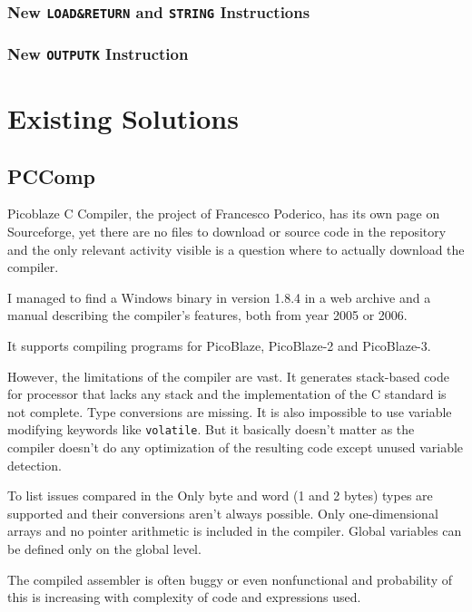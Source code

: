         \subsection{New \texttt{LOAD\&RETURN} and \texttt{STRING} Instructions}

        

        \subsection{New \texttt{OUTPUTK} Instruction}



\chapter{Existing Solutions}\label{existing}

    \section{PCComp}\label{pccomp}

    Picoblaze C Compiler, the project of Francesco Poderico, has its own page on Sourceforge, %
    yet there are no files to download or source code in the repository and the only relevant activity visible is a question where to actually download the compiler.

    I managed to find a Windows binary in version 1.8.4 in a web archive and a manual describing the compiler's features, both from year 2005 or 2006.

    It supports compiling programs for PicoBlaze, PicoBlaze-2 and PicoBlaze-3.

    However, the limitations of the compiler are vast. It generates stack-based code for processor that lacks any stack and the implementation of the C standard is not complete. Type conversions are missing. It is also impossible to use variable modifying keywords like \texttt{volatile}. But it basically doesn't matter as the compiler doesn't do any optimization %
    of the resulting code except unused variable detection.

    To list issues compared in the %
    Only byte and word (1 and 2 bytes) types are supported and their conversions aren't always possible. Only one-dimensional arrays and no pointer arithmetic is included in the compiler. Global variables can be defined only on the global level.

    The compiled assembler is often buggy or even nonfunctional and probability of this is increasing with complexity of code and expressions used.

